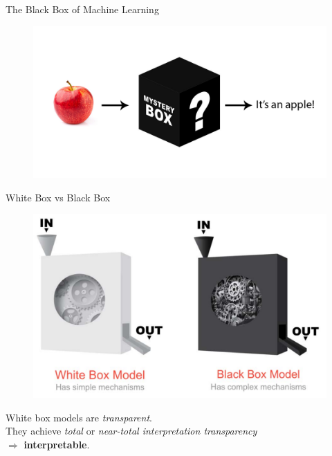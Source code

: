 \documentclass[pdf]{beamer}
\theoremstyle{mystyle}
\begin{document}
\begin{frame}{The Black Box of Machine Learning~\citep{manpreet2019deeplearning}}
	\begin{figure}[!ht]
		\centering
		\includegraphics[scale=1]{images/deeplearningblackbox}
	\end{figure}	
\end{frame}

\begin{frame}{White Box vs Black Box~\citep{masis2021interpretable}}
	\begin{figure}[!ht]
		\centering
		\includegraphics[scale=0.18]{images/white-box-and-black-box}
	\end{figure}
	\begin{block}{}
		\onslide<2->White box models are \textit{transparent}. \\
		\onslide<3->They achieve \textit{total} or \textit{near-total interpretation transparency} \\
		\onslide<4->$\Longrightarrow$ \textbf{interpretable}.
	\end{block}	 
\end{frame}
\end{document}
